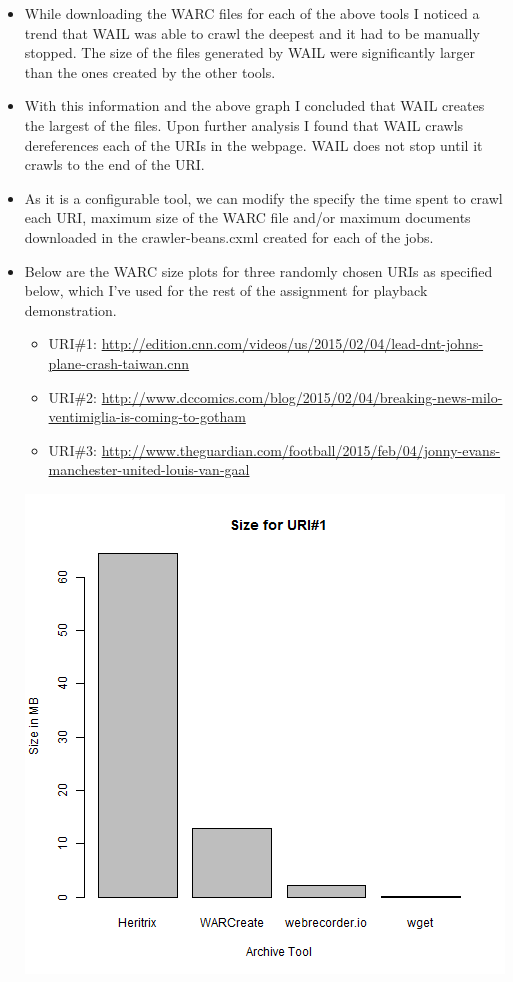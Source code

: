 \begin{itemize}
\item While downloading the WARC files for each of the above tools I noticed a trend that WAIL was able to crawl the deepest and it had to be manually stopped. The size of the files generated by WAIL were significantly larger than the ones created by the other tools.
\item With this information and the above graph I concluded that WAIL creates the largest of the files. Upon further analysis I found that WAIL crawls dereferences each of the URIs in the webpage. WAIL does not stop until it crawls to the end of the URI.
\item As it is a configurable tool, we can modify the specify the time spent to crawl each URI, maximum size of the WARC file and/or maximum documents downloaded in the crawler-beans.cxml created for each of the jobs.
\item Below are the WARC size plots for three randomly chosen URIs as specified below, which I've used for the rest of the assignment for playback demonstration.
	\begin{itemize}
	\item URI\#1: \hyperref[savePage]{http://edition.cnn.com/videos/us/2015/02/04/lead-dnt-johns-plane-crash-taiwan.cnn}
	\item URI\#2: \hyperref[savePage]{http://www.dccomics.com/blog/2015/02/04/breaking-news-milo-ventimiglia-is-coming-to-gotham}
	\item URI\#3: \hyperref[savePage]{http://www.theguardian.com/football/2015/feb/04/jonny-evans-manchester-united-louis-van-gaal}
	\end{itemize}
	\begin{minipage}{\linewidth}
		\centering
		\includegraphics[scale=0.55]{figures/uri1.png}

\end{minipage}
\end{itemize}
